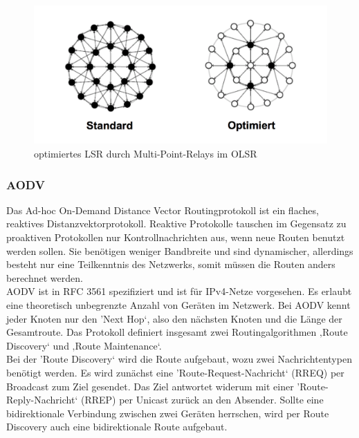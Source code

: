 \begin{figure}[H] 
	\centering
	\includegraphics[scale=0.5]{Bilder/olsr}
	\caption{optimiertes LSR durch Multi-Point-Relays im OLSR\cite{d:timm}}
	\label{f:olsr}
\end{figure}

\subsubsection{AODV}\label{ss:AODV}

Das Ad-hoc On-Demand Distance Vector Routingprotokoll ist ein flaches, reaktives Distanzvektorprotokoll. Reaktive Protokolle tauschen im Gegensatz zu proaktiven Protokollen nur Kontrollnachrichten aus, wenn neue Routen benutzt werden sollen. Sie benötigen weniger Bandbreite und sind dynamischer, allerdings besteht nur eine Teilkenntnis des Netzwerks, somit müssen die Routen anders berechnet werden.\\
AODV ist in RFC 3561 spezifiziert und ist für IPv4-Netze vorgesehen. Es erlaubt eine theoretisch unbegrenzte Anzahl von Geräten im Netzwerk. Bei AODV  kennt jeder Knoten nur den 'Next Hop‘, also den nächsten Knoten und die Länge der Gesamtroute. Das Protokoll definiert insgesamt zwei Routingalgorithmen ‚Route Discovery‘ und ‚Route Maintenance‘.  \\

Bei der 'Route Discovery‘ wird die Route aufgebaut, wozu zwei Nachrichtentypen benötigt werden. Es wird zunächst eine 'Route-Request-Nachricht‘ (RREQ) per Broadcast zum Ziel gesendet. Das Ziel antwortet widerum mit einer 'Route-Reply-Nachricht‘ (RREP) per Unicast zurück an den Absender. Sollte eine bidirektionale Verbindung zwischen zwei Geräten herrschen, wird per Route Discovery auch eine bidirektionale Route aufgebaut. \\

